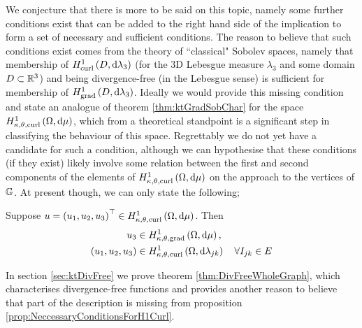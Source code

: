 We conjecture that there is more to be said on this topic, namely some further conditions exist that can be added to the right hand side of the implication to form a set of necessary and sufficient conditions.
The reason to believe that such conditions exist comes from the theory of ``classical" Sobolev spaces, namely that membership of $H^1_\mathrm{curl}\left( D, \mathrm{d}\lambda_3 \right)$ (for the 3D Lebesgue measure $\lambda_3$ and some domain $D\subset\mathbb{R}^3$) and being divergence-free (in the Lebesgue sense) is sufficient for membership of $H^1_\mathrm{grad}\left( D, \mathrm{d}\lambda_3 \right)$.
Ideally we would provide this missing condition and state an analogue of theorem \ref{thm:ktGradSobChar} for the space $H^1_{\kappa,\theta,\mathrm{curl}}\left( \Omega, \mathrm{d}\mu \right)$, which from a theoretical standpoint is a significant step in classifying the behaviour of this space.
Regrettably we do not yet have a candidate for such a condition, although we can hypothesise that these conditions (if they exist) likely involve some relation between the first and second components of the elements of $H^1_{\kappa,\theta,\mathrm{curl}}\left( \Omega, \mathrm{d}\mu \right)$ on the approach to the vertices of $\mathbb{G}$.
At present though, we can only state the following;
\begin{prop} \label{prop:NeccessaryConditionsForH1Curl}
	Suppose $u=\left( u_1,u_2,u_3 \right)^{\top} \in H^1_{\kappa,\theta,\mathrm{curl}}\left( \Omega, \mathrm{d}\mu \right)$.
	Then
	\begin{align*}
		u_3 &\in H^1_{\kappa,\theta,\mathrm{grad}}\left( \Omega, \mathrm{d}\mu \right), \\
		\left( u_1,u_2,u_3 \right) &\in H^1_{\kappa,\theta,\mathrm{curl}}\left( \Omega, \mathrm{d}\lambda_{jk} \right) \quad \forall I_{jk}\in E
	\end{align*}
\end{prop}
In section \ref{sec:ktDivFree} we prove theorem \ref{thm:DivFreeWholeGraph}, which characterises divergence-free functions and provides another reason to believe that part of the description is missing from proposition \ref{prop:NeccessaryConditionsForH1Curl}.

